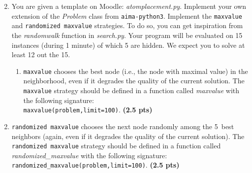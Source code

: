\documentclass[11pt,a4paper]{report}
\begin{document}
\begin{enumerate}
\setcounter{enumi}{1}
    \item You are given a template on Moodle: \textit{atomplacement.py}. Implement your own extension of the \textit{Problem} class from \texttt{aima-python3}. Implement the \texttt{maxvalue} and \texttt{randomized maxvalue} strategies. To do so,
	you can get inspiration from the \textit{randomwalk} function in \textit{search.py}. Your program will be evaluated on 15 instances (during 1 minute) of which 5 are hidden. We expect you to solve at least 12 out the 15.
    \begin{enumerate}
        \item \texttt{maxvalue} chooses the best node (i.e., the node with maximal
        value) in the neighborhood, even if it degrades the quality of the current solution. 
        The \texttt{maxvalue} strategy should be defined in a function called
        \textit{maxvalue} with the following signature: \\
        \texttt{maxvalue(problem,limit=100)}. \textbf{(2.5 pts)}
    \end{enumerate}
\end{enumerate}

\begin{answers}[2.5 cm]
\end{answers}



\begin{enumerate}
\setcounter{enumi}{1}
\begin{enumerate}
\setcounter{enumii}{1}
    \item \texttt{randomized maxvalue} chooses the next node randomly among
        the 5~best neighbors (again, even if it degrades the quality of the current solution).
        The \texttt{randomized maxvalue} strategy should be defined in a function called
        \textit{randomized\_maxvalue} with the following signature: \\
        \texttt{randomized\_maxvalue(problem,limit=100)}. \textbf{(2.5 pts)}
\end{enumerate}
\end{enumerate}

\begin{answers}[2.5 cm]
\end{answers}
\end{document}
